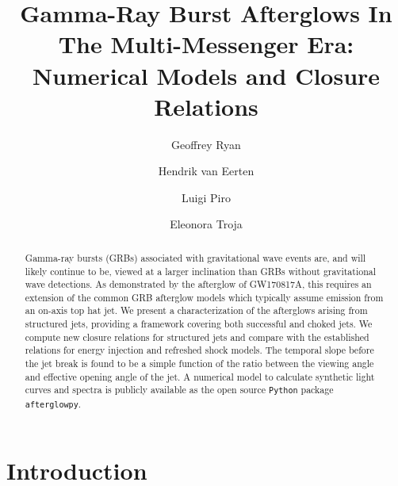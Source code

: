 \documentclass[twocolumn]{aastex62}
\newcommand{\gwbns}{GW170817A}
\newcommand{\afterglowpy}{{\tt afterglowpy}}
\newcommand{\python}{{\tt Python}}
\begin{document}
\title{Gamma-Ray Burst Afterglows In The Multi-Messenger Era: Numerical Models and Closure Relations}


\author[0000-0001-9068-7157]{Geoffrey Ryan}

\author{Hendrik van Eerten}
\author{Luigi Piro}
\author{Eleonora Troja}



\begin{abstract}
	Gamma-ray bursts (GRBs) associated with gravitational wave events are, and will likely continue to be, viewed at a larger inclination than GRBs without gravitational wave detections.  As demonstrated by the afterglow of \gwbns{}, this requires an extension of the common GRB afterglow models which typically assume emission from an on-axis top hat jet.  We present a characterization of the afterglows arising from structured jets, providing a framework covering both successful and choked jets.  We compute new closure relations for structured jets and compare with the established relations for energy injection and refreshed shock models.  The temporal slope before the jet break is found to be a simple function of the ratio between the viewing angle and effective opening angle of the jet.  A numerical model to calculate synthetic light curves and spectra is publicly available as the open source \python{} package \afterglowpy{}.
	
	
\end{abstract}

\section{Introduction}
\end{document}

